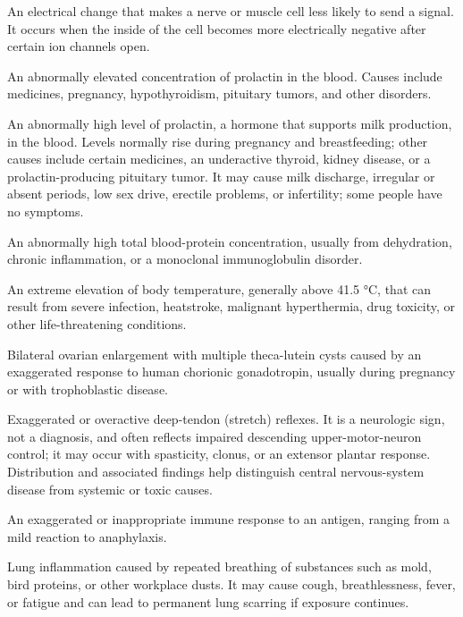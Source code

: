  An electrical change that makes a nerve or muscle cell less likely to send a signal. It occurs when the inside of the cell becomes more electrically negative after certain ion channels open.

 An abnormally elevated concentration of prolactin in the blood. Causes include medicines, pregnancy, hypothyroidism, pituitary tumors, and other disorders.

 An abnormally high level of prolactin, a hormone that supports milk production, in the blood. Levels normally rise during pregnancy and breastfeeding; other causes include certain medicines, an underactive thyroid, kidney disease, or a prolactin-producing pituitary tumor. It may cause milk discharge, irregular or absent periods, low sex drive, erectile problems, or infertility; some people have no symptoms.

 An abnormally high total blood-protein concentration, usually from dehydration, chronic inflammation, or a monoclonal immunoglobulin disorder.

 An extreme elevation of body temperature, generally above 41.5 °C, that can result from severe infection, heatstroke, malignant hyperthermia, drug toxicity, or other life-threatening conditions.

 Bilateral ovarian enlargement with multiple theca-lutein cysts caused by an exaggerated response to human chorionic gonadotropin, usually during pregnancy or with trophoblastic disease.

 Exaggerated or overactive deep-tendon (stretch) reflexes. It is a neurologic sign, not a diagnosis, and often reflects impaired descending upper-motor-neuron control; it may occur with spasticity, clonus, or an extensor plantar response. Distribution and associated findings help distinguish central nervous-system disease from systemic or toxic causes.

 An exaggerated or inappropriate immune response to an antigen, ranging from a mild reaction to
anaphylaxis.

 Lung inflammation caused by repeated breathing of substances such as mold, bird proteins, or other workplace dusts. It may cause cough, breathlessness, fever, or fatigue and can lead to permanent lung scarring if exposure continues.

